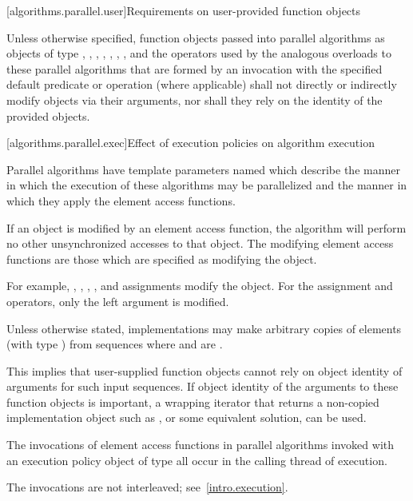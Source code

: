 [algorithms.parallel.user]{Requirements on user-provided function objects}

\pnum
Unless otherwise specified,
function objects passed into parallel algorithms as objects of type
,
,
,
,
,
,
, and
the operators used by the analogous overloads to these parallel algorithms
that are formed by an invocation
with the specified default predicate or operation (where applicable)
shall not directly or indirectly modify objects via their arguments,
nor shall they rely on the identity of the provided objects.

[algorithms.parallel.exec]{Effect of execution policies on algorithm execution}

\pnum
Parallel algorithms have
template parameters named 
which describe the manner in which the execution of these algorithms may be
parallelized and the manner in which they apply the element access functions.

\pnum
If an object is modified by an element access function,
the algorithm will perform no other unsynchronized accesses to that object.
The modifying element access functions are those
which are specified as modifying the object.
\begin{note}
For example,
,
\tcode{++},
\tcode{--},
, and
assignments
modify the object.
For the assignment and  operators, only the left argument is modified.
\end{note}

\pnum
Unless otherwise stated, implementations may make arbitrary copies of elements
(with type ) from sequences
where 
and  are .
\begin{note}
This implies that user-supplied function objects cannot rely on
object identity of arguments for such input sequences.
If object identity of the arguments to these function objects
is important, a wrapping iterator
that returns a non-copied implementation object
such as ,
or some equivalent solution, can be used.
\end{note}

\pnum
The invocations of element access functions in parallel algorithms invoked with
an execution policy object of type  all occur
in the calling thread of execution.
\begin{note}
The invocations are not interleaved; see~\ref{intro.execution}.
\end{note}

